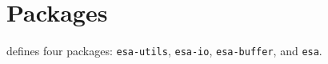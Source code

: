 \chapter{Packages}

\sysname{} defines four packages: \texttt{esa-utils}, \texttt{esa-io},
\texttt{esa-buffer}, and \texttt{esa}.
